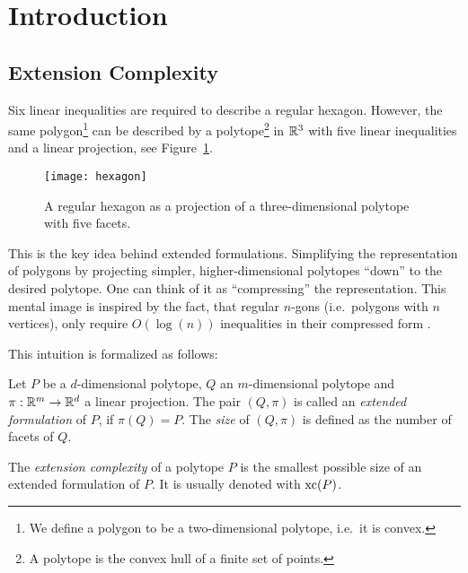 \section{Introduction}

\subsection{Extension Complexity}

Six linear inequalities are required to describe a regular hexagon. However, the same polygon\footnote{We define a polygon to be a two-dimensional polytope, i.e.\ it is convex.} can be described by a polytope\footnote{A polytope is the convex hull of a finite set of points.} in $\mathbb{R}^3$ with five linear inequalities and a linear projection, see Figure~\ref{fig:hexagon}.

\begin{figure}[ht]
  \centering
  \texttt{[image: hexagon]}
  \caption{A regular hexagon as a projection of a three-dimensional polytope with five facets. \cite[Figure~1]{kwan2020extension}}
  \label{fig:hexagon}
\end{figure}

This is the key idea behind extended formulations. Simplifying the representation of polygons by projecting simpler, higher-dimensional polytopes ``down'' to the desired polytope.
One can think of it as ``compressing'' the representation. This mental image is inspired by the fact, that regular $n$-gons (i.e.\ polygons with $n$ vertices), only require $O(\log(n))$ inequalities in their compressed form \cite{kaibel2010constructing}.

This intuition is formalized as follows:

\begin{definition}
  Let $P$ be a $d$-dimensional polytope, $Q$ an $m$\nobreakdash-dimensional polytope and $\pi:\mathbb{R}^m \to \mathbb{R}^d$ a linear projection.
  The pair $(Q,\pi)$ is called an \emph{extended formulation} of $P$, if $\pi(Q)=P$. The \emph{size} of $(Q,\pi)$ is defined as the number of facets of $Q$.
\end{definition}

\begin{definition}
  The \emph{extension complexity} of a polytope $P$ is the smallest possible size of an extended formulation of $P$. It is usually denoted with $\operatorname{xc}(P)$.
\end{definition}

